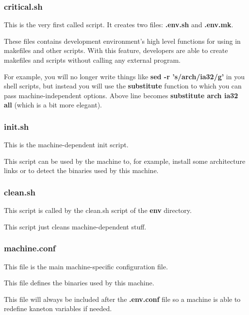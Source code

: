 {%

\begin{frame}
  \frametitle{critical.sh}

  This is the very first called script. It creates two files: \textbf{.env.sh}
  and \textbf{.env.mk}.

  \nl

  These files contains development environment's high level functions for using
  in makefiles and other scripts. With this feature, developers are able to
  create makefiles and scripts without calling any external program.

  \nl

  For example, you will no longer write things like
  \textbf{sed -r 's/arch/ia32/g'} in you shell scripts, but instead you will
  use the \textbf{substitute} function to which you can pass
  machine-independent options. Above line becomes
  \textbf{substitute arch ia32 all} (which is a bit more elegant).
\end{frame}


\begin{frame}
  \frametitle{init.sh}

  This is the machine-dependent init script.

  \nl

  This script can be used by the machine to, for example, install some
  architecture links or to detect the binaries used by this machine.
\end{frame}


\begin{frame}
  \frametitle{clean.sh}

  This script is called by the clean.sh script of the \textbf{env}
  directory.

  \nl

  This script just cleans machine-dependent stuff.
\end{frame}


\begin{frame}
  \frametitle{machine.conf}

  This file is the main machine-specific configuration file.

  \nl

  This file defines the binaries used by this machine.

  \nl

  This file will always be included after the \textbf{.env.conf}
  file so a machine is able to redefine kaneton variables if needed.
\end{frame}

}
